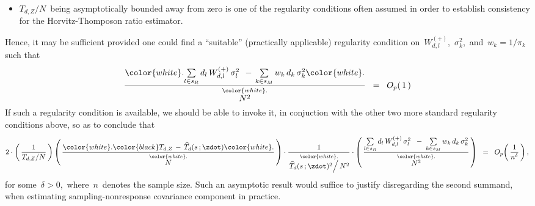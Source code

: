 \begin{itemize}
\begin{itemize}
\begin{itemize}
\begin{equation*}
            \;\; = \;\;
                O_{p}\!\left(\dfrac{1}{\sqrt{\textnormal{\,sample size\,}}}\right),
            \quad
            \textnormal{under suitable regularity conditions on \,$\Zdot$,\, and}
            \end{equation*}
        \item
            $T_{d,Z} \slash N$\, being asymptotically bounded away from zero
            is one of the regularity conditions often assumed in order to establish
            consistency for the Horvitz-Thomposon ratio estimator.
        \end{itemize}
        Hence, it may be sufficient provided one could find
        a ``suitable'' (practically applicable) regularity condition on
        \,$W^{(+)}_{d,l}$,\, $\sigma^{2}_{k}$,\, and \,$w_{k} = 1/\pi_{k}$\,
        such that
        \begin{equation*}
        \dfrac{
            {\color{white}.}
            \underset{l \in s_{R}}{\sum}\,
            d_{l}\,W^{(+)}_{d,l}\,\sigma_{l}^{2}
            \;\,-\,
            \underset{k \in s_{M}}{\sum}\,
            w_{k}\,d_{k}\,\sigma_{k}^{2}
            {\color{white}.}
            }{
            \overset{{\color{white}.}}{N^{2}}                
            }
        \;\; = \;\;
            O_{p}\!\left(\,1\,\right)
        \end{equation*}
        If such a regularity condition is available,
        we should be able to invoke it, in conjuction with the other two more standard regularity conditions above,
        so as to conclude that
        \begin{equation*}
        2
        \cdot
        \left(\,
            \dfrac{1}{T_{d,Z} \slash N}
            \,\right)
        \left(\,
            \dfrac{
                {\color{white}.}
                {\color{black}T_{d,Z}} \,-\, \widehat{T}_{d}(s\,;\zdot)
                {\color{white}.}
                }{
                \overset{{\color{white}.}}{
                    N
                    }
                }           
            \,\right)
        \cdot
        \dfrac{
            1
            }{
            \overset{{\color{white}.}}{
                \left. \widehat{T}_{d}(s\,;\zdot)^{2} \right\slash N^{2}
                }
            }
        \cdot
        \left(\,
            \dfrac{
                \underset{l \in s_{R}}{\sum}\,
                d_{l}\,W^{(+)}_{d,l}\,\sigma_{l}^{2}
                \;\;-\;
                \underset{k \in s_{M}}{\sum}\,
                w_{k}\,d_{k}\,\sigma_{k}^{2}
                }{
                \overset{{\color{white}.}}{N^{2}}                
                }
            \,\right)
        \;\; = \;\;
            O_{p}\!\left(\,\dfrac{1}{n^{\delta}}\,\right),
        \end{equation*}
        for some \,$\delta > 0$,\,
        where \,$n$\, denotes the sample size.
        Such an asymptotic result would suffice to justify disregarding the second summand,
        when estimating sampling-nonresponse covariance component in practice.
    \end{itemize}
\end{itemize}

